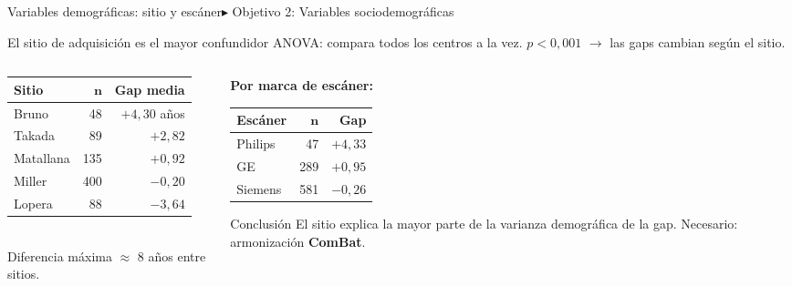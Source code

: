\documentclass[aspectratio=169, 11pt]{beamer}
\begin{document}
\begin{frame}{Variables demográficas: sitio y escáner}{\color{uncyellow}\scriptsize $\blacktriangleright$ Objetivo 2: Variables sociodemográficas}
  \begin{block}{El sitio de adquisición es el mayor confundidor}
    {\small ANOVA: compara todos los centros a la vez. $p < 0{,}001$ $\rightarrow$ las gaps cambian según el sitio.}
  \end{block}

  \vspace{0.15cm}
  \begin{columns}[T]
    \begin{column}{0.52\textwidth}
      {\small
      \begin{tabular}{lrr}
        \toprule
        \textbf{Sitio} & $\boldsymbol{n}$ & \textbf{Gap media} \\
        \midrule
        Bruno       & 48  & $+4{,}30$ años \\
        Takada      & 89  & $+2{,}82$ \\
        Matallana   & 135 & $+0{,}92$ \\
        Miller      & 400 & $-0{,}20$ \\
        Lopera      & 88  & $-3{,}64$ \\
        \bottomrule
      \end{tabular}}
      \\[4pt]
      {\scriptsize Diferencia máxima $\approx$ 8 años entre sitios.}
    \end{column}
    \begin{column}{0.44\textwidth}
      \textbf{Por marca de escáner:}
      \vspace{0.1cm}
      {\small
      \begin{tabular}{lrr}
        \toprule
        \textbf{Escáner} & $\boldsymbol{n}$ & \textbf{Gap} \\
        \midrule
        Philips  &  47 & $+4{,}33$ \\
        GE       & 289 & $+0{,}95$ \\
        Siemens  & 581 & $-0{,}26$ \\
        \bottomrule
      \end{tabular}}
      \vspace{0.15cm}
      \begin{alertblock}{\small Conclusión}
        {\footnotesize El sitio explica la mayor parte de la varianza demográfica de la gap. Necesario: armonización \textbf{ComBat}.}
      \end{alertblock}
    \end{column}
  \end{columns}
\end{frame}
\end{document}
